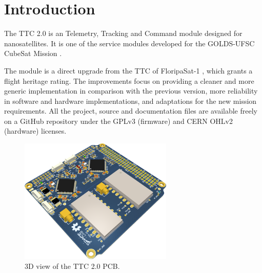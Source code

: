 %
%
%
%
%

%
%
%
%
%


\chapter{Introduction} \label{ch:introduction}

The TTC 2.0 is an Telemetry, Tracking and Command module designed for nanosatellites. It is one of the service modules developed for the GOLDS-UFSC CubeSat Mission \cite{floripasat2}.

The module is a direct upgrade from the TTC of FloripaSat-1 \cite{ttc-fsat}, which grants a flight heritage rating. The improvements focus on providing a cleaner and more generic implementation in comparison with the previous version, more reliability in software and hardware implementations, and adaptations for the new mission requirements. All the project, source and documentation files are available freely on a GitHub repository \cite{ttc2-repo} under the GPLv3 (firmware) and CERN OHLv2 (hardware) licenses.

\begin{figure}[!h]
	\begin{center}
		\includegraphics[width=0.65\textwidth]{figures/ttc2_pcb_3d.png}
		\caption{3D view of the TTC 2.0 PCB.}
		\label{fig:pcb-3d}
	\end{center}
\end{figure}

